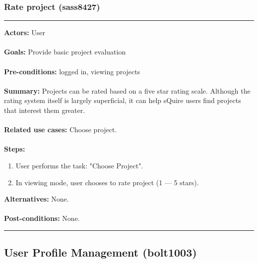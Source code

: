 \documentclass[11pt]{report}
\begin{document}
\subsubsection{Rate project (sass8427)}
\vspace{2pt}
\hrule
\vspace{8pt}
 \textbf{Actors:} User \\ \\
\textbf{Goals:} Provide basic project evaluation \\ \\
 \textbf{Pre-conditions:} logged in, viewing projects \\ \\
\textbf{Summary:} Projects can be rated based on a five star rating scale. Although the rating system itself is largely superficial, it can help sQuire users find projects that interest them greater. \\ \\
\textbf{Related use cases:} Choose project.\\ \\
\textbf{Steps:} \begin{enumerate}
  \item User performs the task: "Choose Project". 
  \item In viewing mode, user chooses to rate project (1 --- 5 stars).
 \end{enumerate}
 \textbf{Alternatives:} None. \\ \\
 \textbf{Post-conditions:} None. \\
\vspace{8pt}
\hrule
\newpage

\subsection{User Profile Management (bolt1003)}
\end{document}
